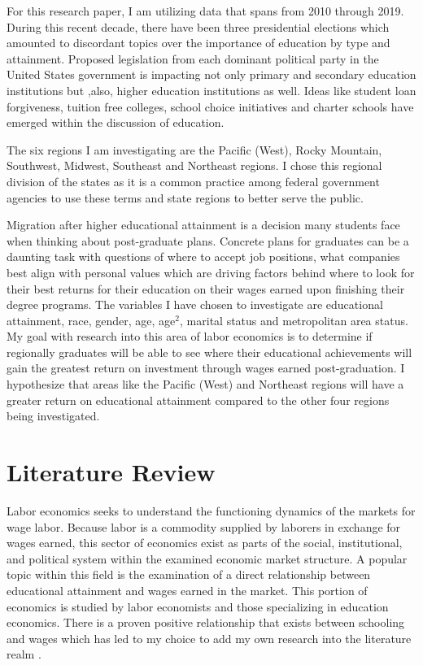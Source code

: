 \documentclass[12pt, English]{article}
\begin{document}
For this research paper, I am utilizing data that spans from 2010 through 2019. During this recent decade, there have been three presidential elections which amounted to discordant topics over the importance of education by type and attainment. Proposed legislation from each dominant political party in the United States government is impacting not only primary and secondary education institutions but ,also, higher education institutions as well. Ideas like student loan forgiveness, tuition free colleges, school choice initiatives and charter schools have emerged within the discussion of education. 

The six regions I am investigating are the Pacific (West), Rocky Mountain, Southwest, Midwest, Southeast and Northeast regions. I chose this regional division of the states as it is a common practice among federal government agencies to use these terms and state regions to  better serve the public. 

Migration after higher educational attainment is a decision many students face when thinking about post-graduate plans. Concrete plans for graduates can be a daunting task with questions of where to accept job positions, what companies best align with personal values which are driving factors behind where to look for their best returns for their education on their wages earned upon finishing their degree programs. The variables I have chosen to investigate are educational attainment, race, gender, age, age$^2$, marital status and metropolitan area status. My goal with research into this area of labor economics is to determine if regionally graduates will be able to see where their educational achievements will gain the greatest return on investment through wages earned post-graduation. I hypothesize that areas like the Pacific (West) and Northeast regions will have a greater return on educational attainment compared to the other four regions being investigated.

 
\section{Literature Review}
Labor economics seeks to understand the functioning dynamics of the markets for wage labor. Because labor is a commodity supplied by laborers in exchange for wages earned, this sector of economics exist as parts of the social, institutional, and political system within the examined economic market structure. A popular topic within this field is the examination of a direct relationship between educational attainment and wages earned in the market. This portion of economics is studied by labor economists and those specializing in education economics. There is a proven positive relationship that exists between schooling and wages which has led to my choice to add my own research into the literature realm \citep{dickson2011economic}. 
\end{document}
